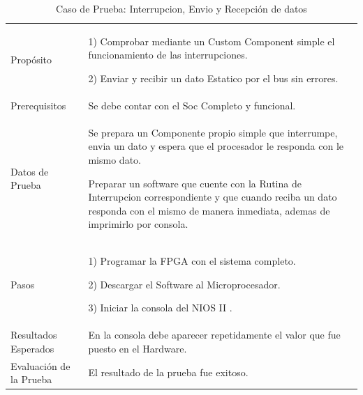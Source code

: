 \begin{table}
	\begin{tabular}{|>{\columncolor[gray]{0.8}}l|p{9cm}|} \hline
\multicolumn{2}{|>{\columncolor[gray]{0.8}}l|}{\textbf{Caso de Prueba: Interrupcion, Envio y Recepción de datos}}\\ \hline
Propósito  & 1) Comprobar mediante un Custom Component simple el funcionamiento de las interrupciones.

2) Enviar y recibir un dato Estatico por el bus sin errores. 
\\ \hline
 Prerequisitos  & Se debe contar con el Soc Completo y funcional.\\ \hline
 Datos de Prueba & Se prepara un Componente propio simple que interrumpe, envia un dato y espera que el procesador le responda con le mismo dato. 

Preparar un software que cuente con la Rutina de Interrupcion correspondiente y que cuando reciba un dato responda con el mismo de manera inmediata, ademas de imprimirlo por consola.
 \\ \hline
 Pasos & 1) Programar la FPGA con el sistema completo.

2) Descargar el Software al Microprocesador.

3) Iniciar la consola del NIOS II .
\\ \hline
 Resultados Esperados & En la consola debe aparecer repetidamente el valor que fue puesto en el Hardware. \\ \hline
 Evaluación de la Prueba  & El resultado de la prueba fue exitoso.\\ \hline
	\end{tabular}
	\caption{Caso de Prueba: Interrupcion, Envio y Recepción de datos}
	\label{tab:enviorecepcion}
\end{table}
